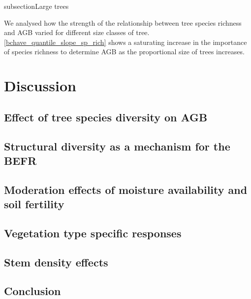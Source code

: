 \documentclass[11pt,a4paper]{article}
\begin{document}
subsection{Large trees}

We analysed how the strength of the relationship between tree species richness and AGB varied for different size classes of tree. \autoref{bchave_quantile_slope_sp_rich} shows a saturating increase in the importance of species richness to determine AGB as the proportional size of trees increases. 

\section{Discussion}


\subsection{Effect of tree species diversity on AGB}

\subsection{Structural diversity as a mechanism for the BEFR}

\subsection{Moderation effects of moisture availability and soil fertility}

\subsection{Vegetation type specific responses}

\subsection{Stem density effects}



%

\subsection{Conclusion}
\end{document}
